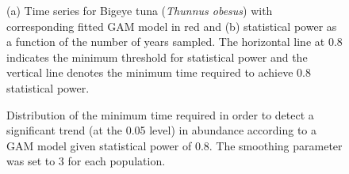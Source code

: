 \documentclass[12pt,]{article}
\begin{document}
\begin{figure}[htbp]
\centering
\caption{(a) Time series for Bigeye tuna (\emph{Thunnus obesus}) with
corresponding fitted GAM model in red and (b) statistical power as a
function of the number of years sampled. The horizontal line at 0.8
indicates the minimum threshold for statistical power and the vertical
line denotes the minimum time required to achieve 0.8 statistical
power.\label{fig:gam_example}}
\end{figure}

\begin{figure}[htbp]
\centering
\caption{Distribution of the minimum time required in order to detect a
significant trend (at the 0.05 level) in abundance according to a GAM
model given statistical power of 0.8. The smoothing parameter was set to
3 for each population.\label{fig:min_time_dist_gam}}
\end{figure}
\end{document}
